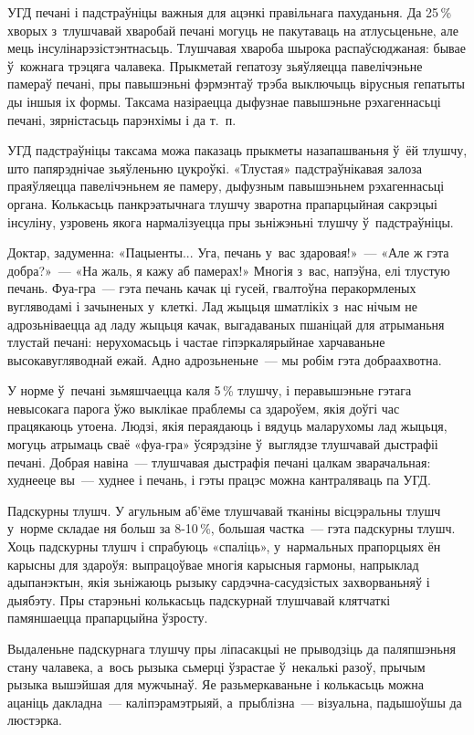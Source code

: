 УГД печані і падстраўніцы важныя для ацэнкі правільнага пахуданьня. Да 25\,\% хворых з~тлушчавай хваробай печані могуць не пакутаваць на атлусьценьне, але мець інсулінарэзістэнтнасьць. Тлушчавая хвароба шырока распаўсюджаная: бывае ў~кожнага трэцяга чалавека. Прыкметай гепатозу зьяўляецца павелічэньне памераў печані, пры павышэньні фэрмэнтаў трэба выключыць вірусныя гепатыты ды іншыя іх формы. Таксама назіраецца дыфузнае павышэньне рэхагеннасьці печані, зярністасьць парэнхімы і да т.~п.

УГД падстраўніцы таксама можа паказаць прыкметы назапашваньня ў~ёй тлушчу, што папярэднічае зьяўленьню цукроўкі. «Тлустая» падстраўнікавая залоза праяўляецца павелічэньнем яе памеру, дыфузным павышэньнем рэхагеннасьці органа. Колькасьць панкрэатычнага тлушчу зваротна прапарцыйная сакрэцыі інсуліну, узровень якога нармалізуецца пры зьніжэньні тлушчу ў~падстраўніцы.

Доктар, задуменна: «Пацыенты... Уга, печань у~вас здаровая!»~--- «Але ж гэта добра?»~--- «На жаль, я кажу аб памерах!» Многія з~вас, напэўна, елі тлустую печань. Фуа-гра~--- гэта печань качак ці гусей, гвалтоўна перакормленых вугляводамі і зачыненых у~клеткі. Лад жыцьця шматлікіх з~нас нічым не адрозьніваецца ад ладу жыцьця качак, выгадаваных пшаніцай для атрыманьня тлустай печані: нерухомасьць і частае гіпэркалярыйнае харчаваньне высокавугляводнай ежай. Адно адрозьненьне~--- мы робім гэта добраахвотна.

У норме ў~печані зьмяшчаецца каля 5\,\% тлушчу, і перавышэньне гэтага невысокага парога ўжо выклікае праблемы са здароўем, якія доўгі час працякаюць утоена. Людзі, якія пераядаюць і вядуць маларухомы лад жыцьця, могуць атрымаць сваё «фуа-гра» ўсярэдзіне ў~выглядзе тлушчавай дыстрафіі печані. Добрая навіна~--- тлушчавая дыстрафія печані цалкам зварачальная: худнееце вы~--- худнее і печань, і гэты працэс можна кантраляваць па УГД.

Падскурны тлушч. У агульным аб'ёме тлушчавай тканіны вісцэральны тлушч у~норме складае ня больш за 8-10\,\%, большая частка~--- гэта падскурны тлушч. Хоць падскурны тлушч і спрабуюць «спаліць», у~нармальных прапорцыях ён карысны для здароўя: выпрацоўвае многія карысныя гармоны, напрыклад адыпанэктын, якія зьніжаюць рызыку сардэчна-сасудзістых захворваньняў і дыябэту. Пры старэньні колькасьць падскурнай тлушчавай клятчаткі памяншаецца прапарцыйна ўзросту.

Выдаленьне падскурнага тлушчу пры ліпасакцыі не прыводзіць да паляпшэньня стану чалавека, а~вось рызыка сьмерці ўзрастае ў~некалькі разоў, прычым рызыка вышэйшая для мужчынаў. Яе разьмеркаваньне і колькасьць можна ацаніць дакладна~--- каліпэрамэтрыяй, а~прыблізна~--- візуальна, падышоўшы да люстэрка.

